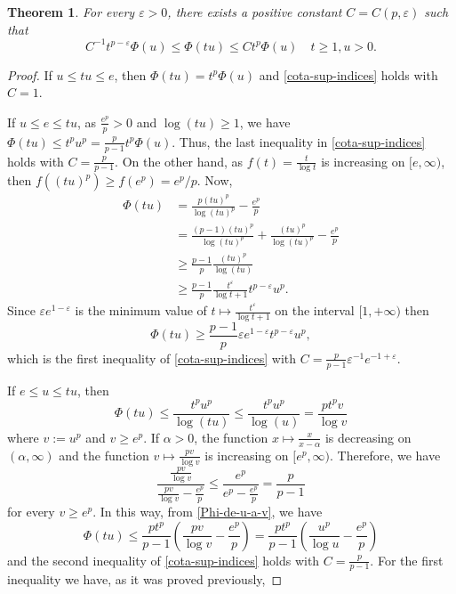 \documentclass[twoside]{article}
\newtheorem{thm}{Theorem}[section]
\theoremstyle{remark}
\renewcommand{\leq}{\leqslant}
\renewcommand{\geq}{\geqslant}
\begin{document}
\begin{thm} For every $\varepsilon>0$, there exists a positive constant $C=C(p,\varepsilon)$  such that
\begin{equation}\label{cota-sup-indices}
C^{-1}t^{p-\varepsilon}\Phi(u)\leq \Phi(tu) \leq Ct^p\Phi(u)\quad t\geq 1, u>0.
\end{equation}
\end{thm}

\begin{proof} If $u\leq tu\leq e$, then $\Phi(tu)=t^p\Phi(u)$ and \eqref{cota-sup-indices} holds with $C=1$.

If $u\leq e\leq tu$, as $\frac{e^p}{p}>0$  and $\log(tu)\geq 1$, we have 
$\Phi(tu)\leq t^pu^p= \frac{p}{p-1}t^p\Phi(u)$. Thus, the last inequality in  \eqref{cota-sup-indices} holds with $C=\frac{p}{p-1}$. On the other hand, as $f(t)=\frac{t}{\log t}$ is increasing on $[e,\infty)$, then $f((tu)^p)\geq  f(e^p)=e^p/p$.
Now, 
\[
\begin{split}
\Phi(tu)&=\frac{p(tu)^p}{\log (tu)^p}-\frac{e^p}{p}\\
&= \frac{(p-1)(tu)^p}{\log(tu)^p}+\frac{(tu)^p}{\log (tu)^p}-\frac{e^p}{p}
\\
&\geq \frac{p-1}{p}\frac{(tu)^p}{\log(tu)}\\
&\geq
\frac{p-1}{p}\frac{t^{\varepsilon}}{\log t+1}t^{p-\varepsilon}u^p.
\end{split}
\]
Since $\varepsilon e^{1-\varepsilon}$ is the minimum value of $t\mapsto\frac{t^{\varepsilon}}{\log t+1}$  on the interval $[1,+\infty)$ then  
\[
\Phi(tu)\geq \frac{p-1}{p}\varepsilon e^{1-\varepsilon}t^{p-\varepsilon}u^p,
\]
which is the first inequality of \eqref{cota-sup-indices} with $C=\frac{p}{p-1}\varepsilon^{-1} e^{-1+\varepsilon}$.  


If $e\leq u\leq tu$, then 
\begin{equation}\label{Phi-de-u-a-v}
\Phi(tu)\leq \frac{t^pu^p}{\log(tu)}\leq \frac{t^pu^p}{\log(u)}=\frac{pt^pv}{\log v}
\end{equation} where $v:=u^p$ and $v\geq e^p$.  If $\alpha>0$, the function $x\mapsto \frac{x}{x-\alpha}$ is decreasing on $(\alpha,\infty)$ 
and the function $v\mapsto \frac{pv}{\log v}$ is increasing  on $[e^p,\infty)$. 
Therefore,  we have 
\[
\frac{\frac{pv}{\log v}}{\frac{pv}{\log v}-\frac{e^p}{p}}\leq 
\frac{e^p}{e^p-\frac{e^p}{p}}=\frac{p}{p-1}
\]
for every $v \geq e^p$. In this way, from \eqref{Phi-de-u-a-v}, we have
\[
\Phi(tu)\leq \frac{pt^p}{p-1}\left(\frac{pv}{\log v}-\frac{e^p}{p}\right)=
 \frac{pt^p}{p-1}\left(\frac{u^p}{\log u}-\frac{e^p}{p}\right)
\]
and the second inequality of  \eqref{cota-sup-indices} holds with $C=\frac{p}{p-1}$. For the first inequality we have, as it was proved previously,


\end{proof}
\end{document}
